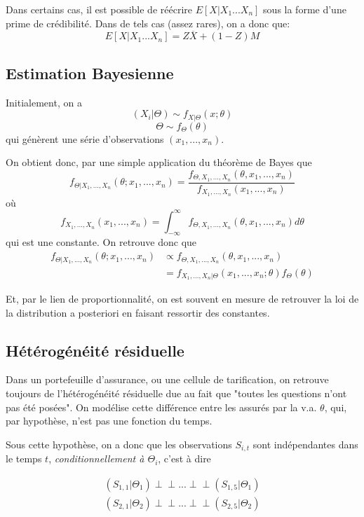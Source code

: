 \documentclass[11pt,french]{report}
\begin{document}
Dans certains cas, il est possible de réécrire $E[X|X_1 ... X_n]$ sous la forme d'une prime de crédibilité. Dans de tels cas (assez rares), on a donc que:
$$E[X|X_1 ... X_n] = Z \overline{X} + (1-Z)M$$

\subsection{Estimation Bayesienne}

Initialement, on a
$$(X_i|\Theta) \sim f_{X|\Theta}(x;\theta)$$
$$\Theta \sim f_{\Theta}(\theta)$$
qui génèrent une série d'observations $(x_1, ..., x_n)$.

On obtient donc, par une simple application du théorème de Bayes que
$$f_{\Theta|X_1,...,X_n}(\theta; x_1,...,x_n) = \frac{f_{\Theta,X_1,...,X_n}(\theta, x_1,...,x_n)}{f_{X_1,...,X_n}( x_1,...,x_n)}$$
où
$$f_{X_1,...,X_n}( x_1,...,x_n) = \int_{-\infty}^{\infty} f_{\Theta,X_1,...,X_n}(\theta, x_1,...,x_n) d\theta$$
qui est une constante.
On retrouve donc que 
$$ \begin{aligned} f_{\Theta|X_1,...,X_n}(\theta; x_1,...,x_n) &\propto  f_{\Theta,X_1,...,X_n}(\theta, x_1,...,x_n) \\
 &= f_{X_1,...,X_n|\Theta}(x_1,...,x_n;\theta) f_{\Theta}(\theta)  \end{aligned}$$

Et, par le lien de proportionnalité, on est souvent en mesure de retrouver la loi de la distribution a posteriori en faisant ressortir des constantes.

\subsection{Hétérogénéité résiduelle}

Dans un portefeuille d'assurance, ou une cellule de tarification, on retrouve toujours de l'hétérogénéité résiduelle due au fait que "toutes les questions n'ont pas été posées". On modélise cette différence entre les assurés par la v.a. $\theta$, qui, par hypothèse, n'est pas une fonction du temps. 

Sous cette hypothèse, on a donc que les observations $S_{i,t}$ sont indépendantes dans le temps $t$, \emph{conditionnellement à $\Theta_i$}, c'est à dire

$$ \begin{aligned} (S_{1,1}|\Theta_1) {\perp\!\!\!\perp}...{\perp\!\!\!\perp} (S_{1,5}|\Theta_1) \\ 
(S_{2,1}|\Theta_2) {\perp\!\!\!\perp}...{\perp\!\!\!\perp} (S_{2,5}|\Theta_2)\end{aligned}$$
\end{document}
